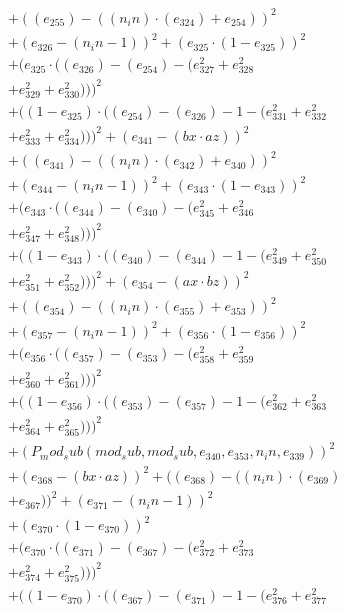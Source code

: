\documentclass[10pt, a4paper]{article}
\begin{document}
\begin{small}
\begin{align*}
& + ((e_{255}) - ((n_in)  \cdot  (e_{324}) + e_{254}))^{2} \\
& + (e_{326} - (n_in - 1))^{2} + (e_{325}  \cdot  (1 - e_{325}))^{2} \\
& + (e_{325}  \cdot  ((e_{326}) - (e_{254}) - (e_{327}^{2} + e_{328}^{2} \\
& + e_{329}^{2} + e_{330}^{2})))^{2} \\
& + ((1 - e_{325})  \cdot  ((e_{254}) - (e_{326}) - 1 - (e_{331}^{2} + e_{332}^{2} \\
& + e_{333}^{2} + e_{334}^{2})))^{2} + (e_{341} - (bx  \cdot  az))^{2} \\
& + ((e_{341}) - ((n_in)  \cdot  (e_{342}) + e_{340}))^{2} \\
& + (e_{344} - (n_in - 1))^{2} + (e_{343}  \cdot  (1 - e_{343}))^{2} \\
& + (e_{343}  \cdot  ((e_{344}) - (e_{340}) - (e_{345}^{2} + e_{346}^{2} \\
& + e_{347}^{2} + e_{348}^{2})))^{2} \\
& + ((1 - e_{343})  \cdot  ((e_{340}) - (e_{344}) - 1 - (e_{349}^{2} + e_{350}^{2} \\
& + e_{351}^{2} + e_{352}^{2})))^{2} + (e_{354} - (ax  \cdot  bz))^{2} \\
& + ((e_{354}) - ((n_in)  \cdot  (e_{355}) + e_{353}))^{2} \\
& + (e_{357} - (n_in - 1))^{2} + (e_{356}  \cdot  (1 - e_{356}))^{2} \\
& + (e_{356}  \cdot  ((e_{357}) - (e_{353}) - (e_{358}^{2} + e_{359}^{2} \\
& + e_{360}^{2} + e_{361}^{2})))^{2} \\
& + ((1 - e_{356})  \cdot  ((e_{353}) - (e_{357}) - 1 - (e_{362}^{2} + e_{363}^{2} \\
& + e_{364}^{2} + e_{365}^{2})))^{2} \\
& + (P_mod_sub(mod_sub, mod_sub, e_{340}, e_{353}, n_in, e_{339}))^{2} \\
& + (e_{368} - (bx  \cdot  az))^{2} + ((e_{368}) - ((n_in)  \cdot  (e_{369}) \\
& + e_{367}))^{2} + (e_{371} - (n_in - 1))^{2} \\
& + (e_{370}  \cdot  (1 - e_{370}))^{2} \\
& + (e_{370}  \cdot  ((e_{371}) - (e_{367}) - (e_{372}^{2} + e_{373}^{2} \\
& + e_{374}^{2} + e_{375}^{2})))^{2} \\
& + ((1 - e_{370})  \cdot  ((e_{367}) - (e_{371}) - 1 - (e_{376}^{2} + e_{377}^{2} \\

\end{align*}
\end{small}
\end{document}
